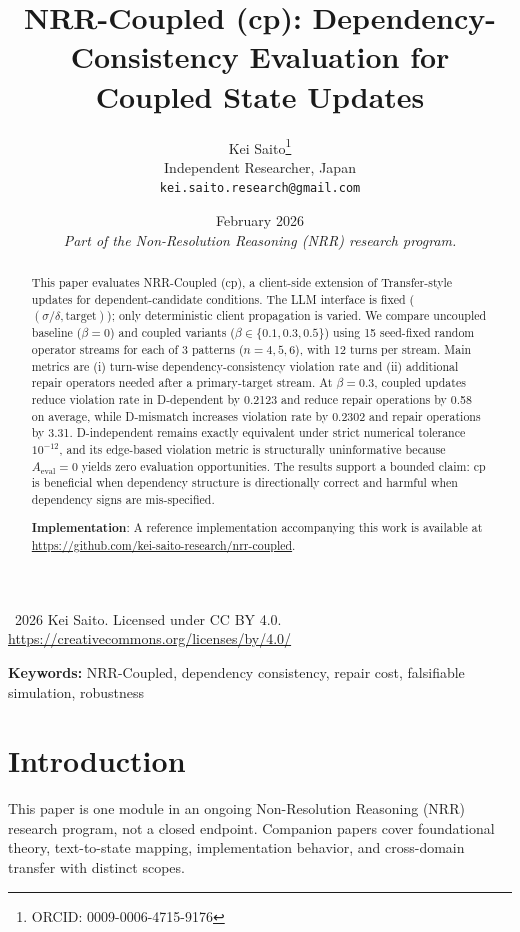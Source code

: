 \documentclass[11pt,a4paper]{article}
\title{\textbf{NRR-Coupled (cp): Dependency-Consistency Evaluation for Coupled State Updates}}
\author{
  Kei Saito\thanks{ORCID: 0009-0006-4715-9176} \\
  Independent Researcher, Japan \\
  \texttt{kei.saito.research@gmail.com}
}
\date{February 2026 \\[0.5em]
\textit{Part of the Non-Resolution Reasoning (NRR) research program.}}
\begin{document}
\maketitle

\begin{center}
\textcopyright\ 2026 Kei Saito. Licensed under CC BY 4.0.\\
\url{https://creativecommons.org/licenses/by/4.0/}
\end{center}

\begin{abstract}
This paper evaluates NRR-Coupled (cp), a client-side extension of Transfer-style updates for dependent-candidate conditions. The LLM interface is fixed (\((\sigma/\delta,\text{target})\)); only deterministic client propagation is varied. We compare uncoupled baseline (\(\beta=0\)) and coupled variants (\(\beta\in\{0.1,0.3,0.5\}\)) using 15 seed-fixed random operator streams for each of 3 patterns (\(n=4,5,6\)), with 12 turns per stream. Main metrics are (i) turn-wise dependency-consistency violation rate and (ii) additional repair operators needed after a primary-target stream. At \(\beta=0.3\), coupled updates reduce violation rate in D-dependent by 0.2123 and reduce repair operations by 0.58 on average, while D-mismatch increases violation rate by 0.2302 and repair operations by 3.31. D-independent remains exactly equivalent under strict numerical tolerance \(10^{-12}\), and its edge-based violation metric is structurally uninformative because \(A_{\text{eval}}=0\) yields zero evaluation opportunities. The results support a bounded claim: cp is beneficial when dependency structure is directionally correct and harmful when dependency signs are mis-specified.

\textbf{Implementation}: A reference implementation accompanying this work is available at \url{https://github.com/kei-saito-research/nrr-coupled}.
\end{abstract}

\noindent\textbf{Keywords:} NRR-Coupled, dependency consistency, repair cost, falsifiable simulation, robustness

\section{Introduction}
This paper is one module in an ongoing Non-Resolution Reasoning (NRR) research program, not a closed endpoint. Companion papers cover foundational theory, text-to-state mapping, implementation behavior, and cross-domain transfer with distinct scopes\cite{saito2025nrr,saito2026phi,saito2026transfer}.
\end{document}
